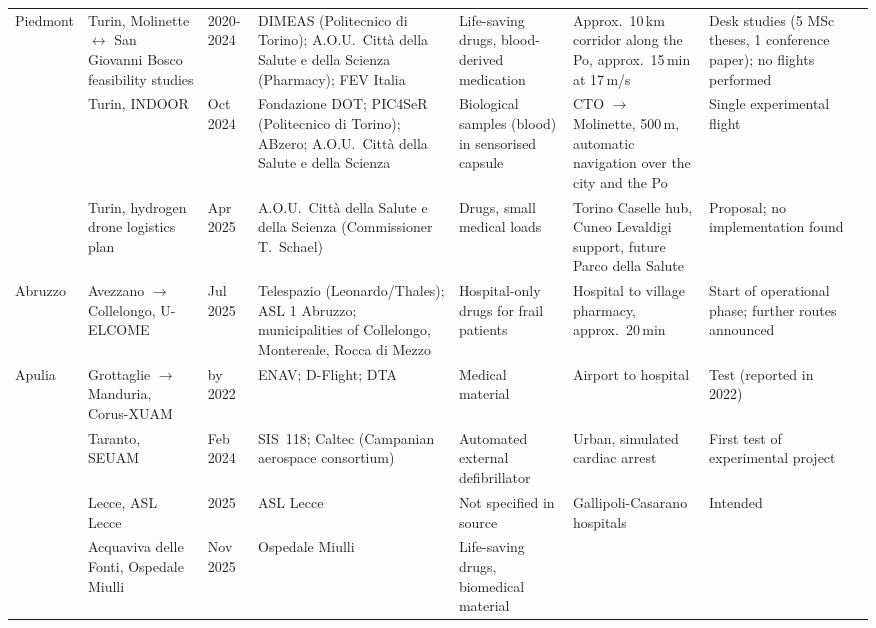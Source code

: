 \begin{landscape}
\begin{longtable}{G{0.078} L{0.119} L{0.064} L{0.200} L{0.132} L{0.183} L{0.151} L{0.073}}
Piedmont
& Turin, Molinette $\leftrightarrow$ San Giovanni Bosco feasibility studies
& 2020-2024
& DIMEAS (Politecnico di Torino); A.O.U.\ Citt\`a della Salute e della Scienza (Pharmacy); FEV Italia
& Life-saving drugs, blood-derived medication
& Approx.\ 10\,km corridor along the Po, approx.\ 15\,min at 17\,m/s
& Desk studies (5 MSc theses, 1 conference paper); no flights performed
& \cite{Cavallo2020, Bertelli2021, Sivieri2021, Fiorentino2021, Angelini2023, Angelini2024ICAS} \\
& Turin, INDOOR
& Oct 2024
& Fondazione DOT; PIC4SeR (Politecnico di Torino); ABzero; A.O.U.\ Citt\`a della Salute e della Scienza
& Biological samples (blood) in sensorised capsule
& CTO $\to$ Molinette, 500\,m, automatic navigation over the city and the Po
& Single experimental flight
& \cite{cds_indoor, dot_indoor} \\
& Turin, hydrogen drone logistics plan
& Apr 2025
& A.O.U.\ Citt\`a della Salute e della Scienza (Commissioner T.~Schael)
& Drugs, small medical loads
& Torino Caselle hub, Cuneo Levaldigi support, future Parco della Salute
& Proposal; no implementation found
& \cite{hydronews_torino, supplychain_torino} \\
\grouprule
Abruzzo
& Avezzano $\to$ Collelongo, U-ELCOME
& Jul 2025
& Telespazio (Leonardo/Thales); ASL 1 Abruzzo; municipalities of Collelongo, Montereale, Rocca di Mezzo
& Hospital-only drugs for frail patients
& Hospital to village pharmacy, approx.\ 20\,min
& Start of operational phase; further routes announced
& \cite{asl1_uelcome, abruzzospeciale_uelcome} \\
\grouprule
Apulia
& Grottaglie $\to$ Manduria, Corus-XUAM
& by 2022
& ENAV; D-Flight; DTA
& Medical material
& Airport to hospital
& Test (reported in 2022)
& \cite{quadricottero_2022} \\
& Taranto, SEUAM
& Feb 2024
& SIS~118; Caltec (Campanian aerospace consortium)
& Automated external defibrillator
& Urban, simulated cardiac arrest
& First test of experimental project
& \cite{ansa_seuam} \\
& Lecce, ASL Lecce
& 2025
& ASL Lecce
& Not specified in source
& Gallipoli-Casarano hospitals
& Intended
& \cite{sanitadigitale_boom} \\
& Acquaviva delle Fonti, Ospedale Miulli
& Nov 2025
& Ospedale Miulli
& Life-saving drugs, biomedical material

\end{longtable}
\end{landscape}
